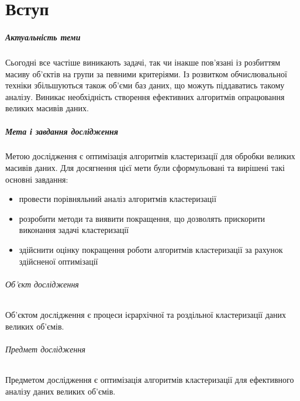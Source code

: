 \chapter*{Вступ}

\paragraph{Актуальність теми}

Сьогодні все частіше виникають задачі, так чи інакше пов'язані із розбиттям масиву об'єктів на групи за певними критеріями. Із розвитком обчислювальної техніки збільшуються також об'єми баз даних, що можуть піддаватись такому аналізу. Виникає необхідність створення ефективних алгоритмів опрацювання великих масивів даних.

\paragraph{Мета і завдання дослідження}

Метою дослідження є оптимізація алгоритмів кластеризації для обробки великих масивів даних.
Для досягнення цієї мети були сформульовані та вирішені такі основні завдання:
\begin{itemize}
    \item провести порівняльний аналіз алгоритмів кластеризації
    \item розробити методи та виявити покращення, що дозволять прискорити виконання задачі кластеризації
    \item здійснити оцінку покращення роботи алгоритмів кластеризації за рахунок здійсненої оптимізації
\end{itemize}

\subparagraph{Об'єкт дослідження}
Об’єктом дослідження є процеси ієрархічної та роздільної кластеризації даних великих об’ємів.

\subparagraph{Предмет дослідження}
Предметом дослідження є оптимізація алгоритмів кластеризації для ефективного аналізу даних великих об’ємів.
